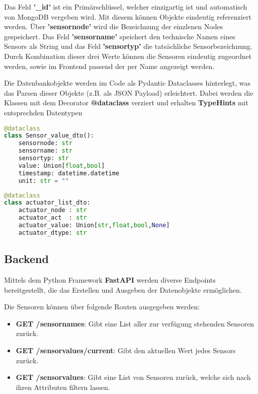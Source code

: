 Das Feld \textbf{'\_id'} ist ein Primärschlüssel, welcher einzigartig ist und automatisch von MongoDB vergeben wird. 
Mit diesem können Objekte eindeutig referenziert werden.
Über \textbf{'sensornode'} wird die Bezeichnung der einzlenen Nodes gespeichert.
Das Feld \textbf{'sensorname'} speichert den technische Namen eines Sensors als String und das Feld \textbf{'sensortyp'} die tatsächliche Sensorbezeichnung. 
Durch Kombination dieser drei Werte können die Sensoren eindeutig zugeordnet werden, sowie im Frontend passend der per Name angezeigt werden.

Die Datenbankobjekte werden im Code als Pydantic Dataclasses hinterlegt, was das Parsen dieser Objekte (z.B. als JSON Payload) erleichtert. 
Dabei werden die Klassen mit dem Decorator \textbf{@dataclass} verziert und erhalten \textbf{TypeHints} mit entsprechden Datentypen

\begin{lstlisting}[language=python,caption={Sensor Dataclass},captionpos=b,showstringspaces=false, basicstyle=\small,label={lst:dataclass}]
@dataclass
class Sensor_value_dto():
    sensornode: str
    sensorname: str
    sensortyp: str
    value: Union[float,bool]
    timestamp: datetime.datetime
    unit: str = ""
\end{lstlisting}

\begin{lstlisting}[language=python,caption={Actuator Dataclass},captionpos=b,showstringspaces=false, basicstyle=\small,label={lst:dataclass}]
@dataclass
class actuator_list_dto:
    actuator_node : str
    actuator_act  : str
    actuator_value: Union[str,float,bool,None]
    actuator_dtype: str
\end{lstlisting}

\subsection{Backend}
Mittels dem Python Framework \textbf{FastAPI} werden diverse Endpoints bereitgestellt, die das Erstellen und Ausgeben der Datenobjekte ermöglichen.

Die Sensoren können über folgende Routen ausgegeben werden:
\begin{itemize}
\item \textbf{GET /sensornames}: Gibt eine List aller zur verfügung stehenden Sensoren zurück.
\item \textbf{GET /sensorvalues/current}: Gibt den aktuellen Wert jedes Sensors zurück.
\item \textbf{GET /sensorvalues}: Gibt eine List von Sensoren zurück, welche sich nach ihren Attributen filtern lassen.
\end{itemize}

